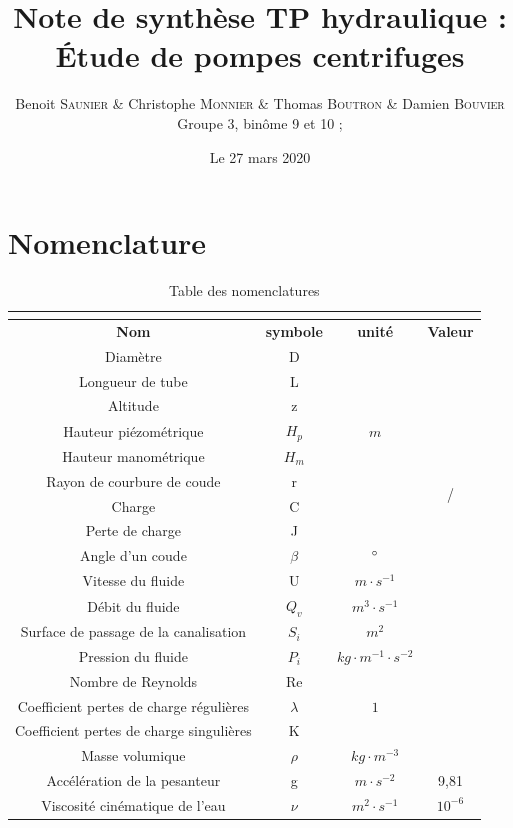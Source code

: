 \documentclass[12pt, a4paper, twoside]{article} %
\date{Le 27 mars 2020} %
\title{Note de synthèse TP hydraulique : \'Etude de pompes centrifuges } %
\author{Benoit \textsc{Saunier} \& Christophe \textsc{Monnier} \& Thomas \textsc{Boutron} \& Damien \textsc{Bouvier} \\  Groupe 3, binôme 9 et 10 ; \thedate} %
\begin{document}
\renewcommand{\contentsname}{Sommaire}

\newpage 
\tableofcontents
\newpage

\section*{Nomenclature}

\begin{table}[H]
    \centering
     \caption{Table des nomenclatures}
    \begin{tabular}{|c|c|c|c|}
    \multicolumn{4}{c}{ }\\
       \hline
        \textbf{Nom} & \textbf{symbole} & \textbf{unité} &\textbf{Valeur} \\
        \hline
        Diamètre & D & \multirow{7}{*}{$m$} &\multirow{12}{*}{/}\\
        \cline{1-2}
        Longueur de tube & L &  & \\
         \cline{1-2}
         Altitude & z &  & \\
         \cline{1-2}
         Hauteur piézométrique & $H_{p}$ &  & \\
         \cline{1-2}
         Hauteur manométrique & $H_{m}$ &  & \\
         \cline{1-2}
        Rayon de courbure de coude & r &  &\\
         \cline{1-2}
         Charge & C &  &\\
         \cline{1-2}
        Perte de charge & J &  & \\
        \cline{1-3}
        Angle d'un coude & $\beta$ & $\degree$ & \\
        \cline{1-3}
        Vitesse du fluide & U& $m\cdot s^{-1}$ & \\
        \cline{1-3}
        Débit du fluide & $Q_v$ & $m^{3}\cdot s^{-1}$ & \\
       \cline{1-3}
       Surface de passage de la canalisation & $S_i$ & $m^{2}$ & \\
       \cline{1-3}
        Pression du fluide & $P_i$ & $kg\cdot m^{-1}\cdot s^{-2}$ & \\
       \cline{1-3}
        Nombre de Reynolds & Re & \multirow{3}{*}{$1$}& \\
       \cline{1-2}
        Coefficient pertes de charge régulières & $\lambda$  &  & \\
        \cline{1-2}
        Coefficient pertes de charge singulières & K&  &\\
        \cline{1-3}
        Masse volumique & $\rho$&  $kg\cdot m^{-3}$&\\
        \hline
        Accélération de la pesanteur & g & $m\cdot s^{-2}$ & 9,81\\
        \hline
        Viscosité cinématique de l'eau & $\nu$ & $m^2 \cdot s^{-1}$& $10^{-6}$\\
        \hline
    \end{tabular}
    \label{tab:nomenclature}
\end{table}
\end{document}

